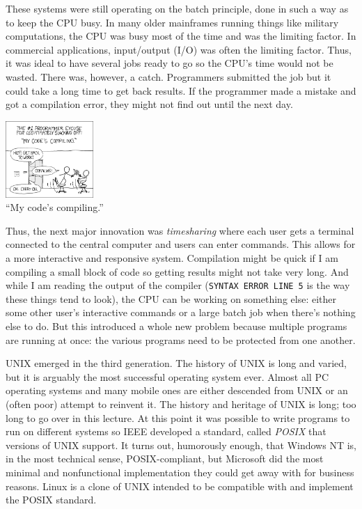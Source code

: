 These systems were still operating on the batch principle, done in such a way as to keep the CPU busy. In many older mainframes running things like military computations, the CPU was busy most of the time and was the limiting factor. In commercial applications, input/output (I/O) was often the limiting factor. Thus, it was ideal to have several jobs ready to go so the CPU's time would not be wasted. There was, however, a catch. Programmers submitted the job but it could take a long time to get back results. If the programmer made a mistake and got a compilation error, they might not find out until the next day. 

\begin{center}
\includegraphics[width=0.25\textwidth]{images/compiling.png}\\
``My code's compiling.'' ~\cite{xkcd:compiling}
\end{center}

Thus, the next major innovation was \textit{timesharing} where each user gets a terminal connected to the central computer and users can enter commands. This allows for a more interactive and responsive system. Compilation might be quick if I am compiling a small block of code so getting results might not take very long. And while I am reading the output of the compiler (\texttt{SYNTAX ERROR LINE 5} is the way these things tend to look), the CPU can be working on something else: either some other user's interactive commands or a large batch job when there's nothing else to do. But this introduced a whole new problem because multiple programs are running at once: the various programs need to be protected from one another.

UNIX emerged in the third generation. The history of UNIX is long and varied, but it is arguably the most successful operating system ever. Almost all PC operating systems and many mobile ones are either descended from UNIX or an (often poor) attempt to reinvent it. The history and heritage of UNIX is long; too long to go over in this lecture. At this point it was possible to write programs to run on different systems so IEEE developed a standard, called \textit{POSIX} that versions of UNIX support. It turns out, humorously enough, that Windows NT is, in the most technical sense, POSIX-compliant, but Microsoft did the most minimal and nonfunctional implementation they could get away with for business reasons. Linux is a clone of UNIX intended to be compatible with and implement the POSIX standard.

